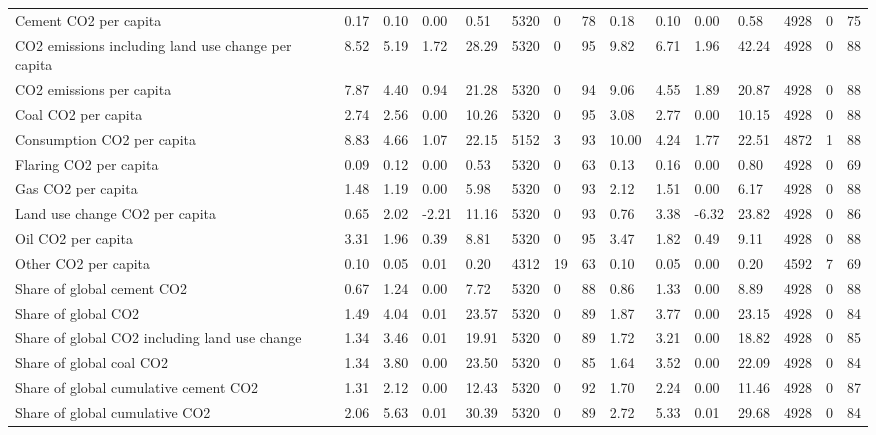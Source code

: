 \begin{longtable}{lllllllllllllll}
\addlinespace
Cement CO2 per capita & 0.17 & 0.10 & 0.00 & 0.51 & 5320 & 0 & 78 & 0.18 & 0.10 & 0.00 & 0.58 & 4928 & 0 & 75\\
CO2 emissions including land use change per capita & 8.52 & 5.19 & 1.72 & 28.29 & 5320 & 0 & 95 & 9.82 & 6.71 & 1.96 & 42.24 & 4928 & 0 & 88\\
CO2 emissions per capita & 7.87 & 4.40 & 0.94 & 21.28 & 5320 & 0 & 94 & 9.06 & 4.55 & 1.89 & 20.87 & 4928 & 0 & 88\\
Coal CO2 per capita & 2.74 & 2.56 & 0.00 & 10.26 & 5320 & 0 & 95 & 3.08 & 2.77 & 0.00 & 10.15 & 4928 & 0 & 88\\
Consumption CO2 per capita & 8.83 & 4.66 & 1.07 & 22.15 & 5152 & 3 & 93 & 10.00 & 4.24 & 1.77 & 22.51 & 4872 & 1 & 88\\
\addlinespace
Flaring CO2 per capita & 0.09 & 0.12 & 0.00 & 0.53 & 5320 & 0 & 63 & 0.13 & 0.16 & 0.00 & 0.80 & 4928 & 0 & 69\\
Gas CO2 per capita & 1.48 & 1.19 & 0.00 & 5.98 & 5320 & 0 & 93 & 2.12 & 1.51 & 0.00 & 6.17 & 4928 & 0 & 88\\
Land use change CO2 per capita & 0.65 & 2.02 & -2.21 & 11.16 & 5320 & 0 & 93 & 0.76 & 3.38 & -6.32 & 23.82 & 4928 & 0 & 86\\
Oil CO2 per capita & 3.31 & 1.96 & 0.39 & 8.81 & 5320 & 0 & 95 & 3.47 & 1.82 & 0.49 & 9.11 & 4928 & 0 & 88\\
Other CO2 per capita & 0.10 & 0.05 & 0.01 & 0.20 & 4312 & 19 & 63 & 0.10 & 0.05 & 0.00 & 0.20 & 4592 & 7 & 69\\
\addlinespace
Share of global cement CO2 & 0.67 & 1.24 & 0.00 & 7.72 & 5320 & 0 & 88 & 0.86 & 1.33 & 0.00 & 8.89 & 4928 & 0 & 88\\
Share of global CO2 & 1.49 & 4.04 & 0.01 & 23.57 & 5320 & 0 & 89 & 1.87 & 3.77 & 0.00 & 23.15 & 4928 & 0 & 84\\
Share of global CO2 including land use change & 1.34 & 3.46 & 0.01 & 19.91 & 5320 & 0 & 89 & 1.72 & 3.21 & 0.00 & 18.82 & 4928 & 0 & 85\\
Share of global coal CO2 & 1.34 & 3.80 & 0.00 & 23.50 & 5320 & 0 & 85 & 1.64 & 3.52 & 0.00 & 22.09 & 4928 & 0 & 84\\
Share of global cumulative cement CO2 & 1.31 & 2.12 & 0.00 & 12.43 & 5320 & 0 & 92 & 1.70 & 2.24 & 0.00 & 11.46 & 4928 & 0 & 87\\
\addlinespace
Share of global cumulative CO2 & 2.06 & 5.63 & 0.01 & 30.39 & 5320 & 0 & 89 & 2.72 & 5.33 & 0.01 & 29.68 & 4928 & 0 & 84\\

\end{longtable}
